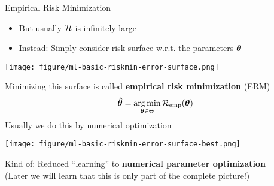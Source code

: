 \documentclass[11pt,compress,t,notes=noshow, xcolor=table]{beamer}
\begin{document}
\begin{vbframe}{Empirical Risk Minimization}
  
  \begin{itemize}
    \item But usually $\mathcal{H}$ is infinitely large
    \item Instead: Simply consider risk surface w.r.t. the parameters $\bm{\theta}$ 
  \end{itemize}
  
  {
  \texttt{[image: figure/ml-basic-riskmin-error-surface.png]}
  }
  
  \framebreak
  
  Minimizing this surface is called \textbf{empirical risk minimization} (ERM)
$$
  \bm{\hat\theta} = \mathop{\mathrm{arg\,min}}_{\bm{\theta} \in \Theta} \mathcal{R}_{\text{emp}}(\bm{\theta})
$$
  Usually we do this by numerical optimization
  
  {
  \vspace{2em}
  \texttt{[image: figure/ml-basic-riskmin-error-surface-best.png]}
  }
  
  \vfill
  
  Kind of: 
  Reduced ``learning'' to 
  \textbf{numerical parameter optimization}\\
  (Later we will learn that this is only part of the complete picture!)
  
\end{vbframe}

\endlecture
\end{document}
